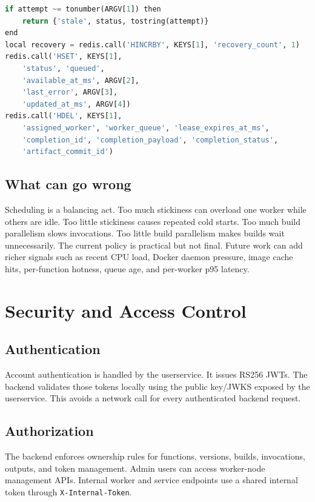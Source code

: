 \documentclass[12pt,a4paper]{report}
\newcommand{\api}[1]{\texttt{#1}}
\begin{document}
\begin{lstlisting}[language=Python,caption={Recovery transition from scheduler/orchestrator\_state.py.}]
if attempt ~= tonumber(ARGV[1]) then
    return {'stale', status, tostring(attempt)}
end
local recovery = redis.call('HINCRBY', KEYS[1], 'recovery_count', 1)
redis.call('HSET', KEYS[1],
    'status', 'queued',
    'available_at_ms', ARGV[2],
    'last_error', ARGV[3],
    'updated_at_ms', ARGV[4])
redis.call('HDEL', KEYS[1],
    'assigned_worker', 'worker_queue', 'lease_expires_at_ms',
    'completion_id', 'completion_payload', 'completion_status',
    'artifact_commit_id')
\end{lstlisting}

\section{What can go wrong}

Scheduling is a balancing act. Too much stickiness can overload one worker
while others are idle. Too little stickiness causes repeated cold starts. Too
much build parallelism slows invocations. Too little build parallelism makes
builds wait unnecessarily. The current policy is practical but not final. Future
work can add richer signals such as recent CPU load, Docker daemon pressure,
image cache hits, per-function hotness, queue age, and per-worker p95 latency.

\clearpage

\chapter{Security and Access Control}

\section{Authentication}

Account authentication is handled by the userservice. It issues RS256 JWTs.
The backend validates those tokens locally using the public key/JWKS exposed by
the userservice. This avoids a network call for every authenticated backend
request.

\section{Authorization}

The backend enforces ownership rules for functions, versions, builds,
invocations, outputs, and token management. Admin users can access worker-node
management APIs. Internal worker and service endpoints use a shared internal
token through \api{X-Internal-Token}.
\end{document}
